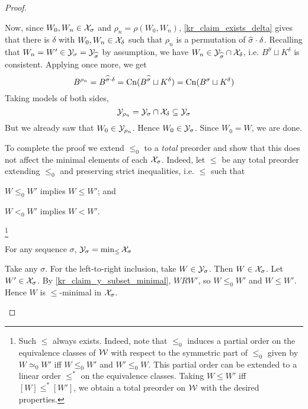 \begin{proof}
\begin{claimproof}
        Now, since $W_0, W_n \in \mathcal{X}_\sigma$ and $\rho_n = \rho(W_0, W_n)$,
        \cref{kr_claim_exists_delta} gives that there is $\delta$ with $W_0, W_n
        \in \mathcal{X}_{\delta}$ such that $\rho_n$ is a permutation of
        $\widehat{\sigma} \cdot \delta$. Recalling that $W_n = W' \in
        \mathcal{Y}_\sigma = \mathcal{Y}_{\widehat{\sigma}}$ by assumption, we have $W_n \in
        \mathcal{Y}_{\widehat{\sigma}} \cap \mathcal{X}_\delta$, i.e. $B^{\widehat{\sigma}}
        \sqcup K^\delta$ is consistent. Applying \incvac{} once
        more, we get
        \[
            B^{\rho_n}
            = B^{\widehat{\sigma} \cdot \delta}
            = \operatorname{Cn}(B^{\widehat{\sigma}} \sqcup K^\delta)
            = \operatorname{Cn}(B^{\sigma} \sqcup K^\delta)
        \]
        Taking models of both sides,
        \[
            \mathcal{Y}_{\rho_n} = \mathcal{Y}_{\sigma} \cap \mathcal{X}_\delta \subseteq \mathcal{Y}_\sigma
        \]
        But we already saw that $W_0 \in \mathcal{Y}_{\rho_n}$. Hence $W_0 \in
        \mathcal{Y}_\sigma$. Since $W_0 = W$, we are done.
    \end{claimproof}

To complete the proof we extend $\le_0$ to a \emph{total} preorder and show
that this does not affect the minimal elements of each $\mathcal{X}_\sigma$. Indeed, let
$\le$ be any total preorder extending $\le_0$ and preserving strict
inequalities, i.e. $\le$ such that
\begin{inlinelist}
    \item $W \le_0 W'$ implies $W \le W'$; and
    \item\label{kr_item_strict_ineq_preserved} $W <_0 W'$ implies $W < W'$.
\end{inlinelist}\footnote{
    Such $\le$ always exists. Indeed, note that $\le_0$ induces a partial order
    on the equivalence classes of $\mathcal{W}$ with respect to the symmetric part of
    $\le_0$ given by $W \simeq_0 W'$ iff $W \le_0 W'$ and $W' \le_0 W$. This
    partial order can be extended to a linear order $\le^*$ on the equivalence
    classes. Taking $W \le W'$ iff $[W]  \le^* [W']$, we obtain a total
    preorder on $\mathcal{W}$ with the desired properties.
}

    \begin{claim}
        For any sequence $\sigma$, $\mathcal{Y}_\sigma = \min_{\le}{\mathcal{X}_\sigma}$
    \end{claim}
    \begin{claimproof}
        Take any $\sigma$. For the left-to-right inclusion, take $W \in
        \mathcal{Y}_\sigma$. Then $W \in \mathcal{X}_\sigma$. Let $W' \in \mathcal{X}_\sigma$. By
        \cref{kr_claim_y_subset_minimal}, $W R W'$, so $W \le_0 W'$ and $W \le
        W'$. Hence $W$ is $\le$-minimal in $\mathcal{X}_\sigma$.


\end{claimproof}
\end{proof}
